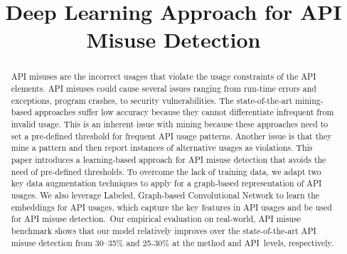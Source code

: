 \documentclass[conference]{IEEEtran}
\begin{document}


\title{Deep Learning Approach for API Misuse Detection}


\maketitle

\begin{abstract}
API misuses are the incorrect usages that violate the usage
constraints of the API elements. API misuses could cause several
issues ranging from run-time errors and exceptions, program crashes,
to security vulnerabilities. The state-of-the-art mining-based
approaches suffer low accuracy because they cannot differentiate
infrequent from invalid usage. This is an inherent issue with mining
because these approaches need to set a pre-defined threshold for
frequent API usage patterns. Another issue is that they mine a pattern
and then report instances of alternative usages as violations. This
paper introduces a learning-based approach for API misuse detection
that avoids the need of pre-defined thresholds. To overcome the lack
of training data, we adapt two key data augmentation techniques to
apply for a graph-based representation of API usages. We also
leverage Labeled, Graph-based Convolutional Network to learn the
embeddings for API usages, which capture the key features in API
usages and be used for API misuse detection.~Our empirical evaluation
on real-world, API misuse benchmark shows that our model relatively
improves over the state-of-the-art API misuse detection from 30--35\%
and 25-30\% at the method and API~levels, respectively.
\end{abstract}
\end{document}
